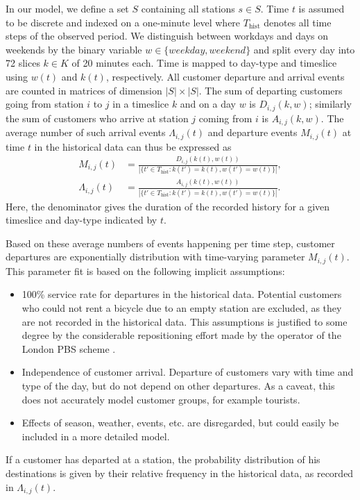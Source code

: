 \documentclass{article}
\providecommand{\Thist}{T_{\textrm{hist}}}
\begin{document}
In our model, we define a set $S$ containing all stations $s\in S$. Time $t$ is
assumed to be discrete and indexed on a one-minute level where $\Thist$ denotes all
time steps of the observed period. We distinguish between workdays and days on
weekends by the binary variable $w\in\{weekday, weekend\}$ and split every day
into 72 slices $k \in K$ of 20 minutes each.
Time is mapped to day-type and timeslice using $w(t)$ and $k(t)$, respectively.
All customer departure and arrival events are counted in matrices of dimension
$|S|\times |S|$. The sum of departing customers going from station $i$ to $j$ in
a timeslice $k$ and on a day $w$ is $D_{i,j}(k,w)$; similarly the sum of
customers who arrive at station $j$ coming from $i$ is $A_{i,j}(k,w)$. The
average number of such arrival events $\Lambda_{i,j}(t)$ and departure events
$M_{i,j}(t)$ at time $t$ in the historical data can thus be expressed as
\begin{align}
  M_{i,j}(t) &= \frac{D_{i,j}\left(k(t),w(t)\right)}{|\{t'\in \Thist: k(t') = k(t), w(t') = w(t)\}|},\\
  \label{eq:averagetotal}
  \Lambda_{i,j}(t) &= \frac{A_{i,j}\left(k(t),w(t)\right)}{|\{t'\in \Thist: k(t') = k(t), w(t') = w(t)\}|}.
\end{align}
Here, the denominator gives the duration of the recorded history for a given
timeslice and day-type indicated by $t$.

Based on these average numbers of events happening per time step, customer
departures are exponentially distribution with time-varying parameter
$M_{i,j}(t)$. This parameter fit is based on the following implicit assumptions:
\begin{itemize}
\item 100\% service rate for departures in the historical data. Potential
  customers who could not rent a bicycle due to an empty station are excluded,
  as they are not recorded in the historical data. This assumptions is justified
  to some degree by the considerable repositioning effort made by the operator
  of the London PBS scheme \cite{stannard2011best}.
\item Independence of customer arrival. Departure of customers vary with time
  and type of the day, but do not depend on other departures. As a caveat, this
  does not accurately model customer groups, for example tourists.
\item Effects of season, weather, events, etc. are disregarded, but could easily be
  included in a more detailed model.
\end{itemize}
If a customer has departed at a station, the probability distribution of his
destinations is given by their relative frequency in the historical data, as
recorded in $\Lambda_{i,j}(t)$.
\end{document}
